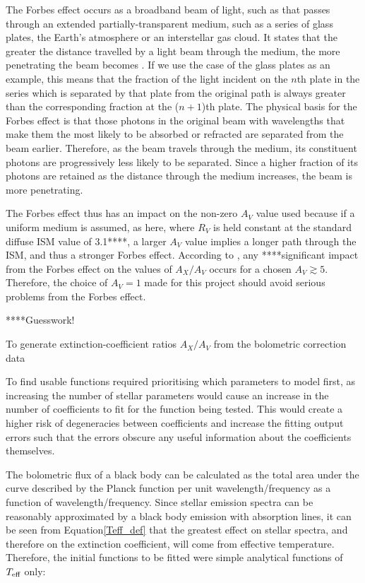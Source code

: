 \documentclass[12pt, a4paper]{report}
\begin{document}
The Forbes effect occurs as a broadband beam of light, such as that passes through an extended partially-transparent medium, such as a series of glass plates, the Earth's atmosphere or an interstellar gas cloud. It states that the greater the distance travelled by a light beam through the medium, the more penetrating the beam becomes \citep{1842RSPT..132..225F}. If we use the case of the glass plates as an example, this means that the fraction of the light incident on the $n$th plate in the series which is separated by that plate from the original path is always greater than the corresponding fraction at the ($n+1$)th plate. The physical basis for the Forbes effect is that those photons in the original beam with wavelengths that make them the most likely to be absorbed or refracted are separated from the beam earlier. Therefore, as the beam travels through the medium, its constituent photons are progressively less likely to be separated. Since a higher fraction of its photons are retained as the distance through the medium increases, the beam is more penetrating.

The Forbes effect thus has an impact on the non-zero $A_{V}$ value used because if a uniform medium is assumed, as here, where $R_{V}$ is held constant at the standard diffuse ISM value of 3.1****, a larger $A_{V}$ value implies a longer path through the ISM, and thus a stronger Forbes effect. According to \cite{2008PASP..120..583G}, any ****significant impact from the Forbes effect on the values of $A_{X}/A_{V}$ occurs for a chosen $A_{V} \gtrsim 5$. Therefore, the choice of $A_{V} = 1$ made for this project should avoid serious problems from the Forbes effect.

****Guesswork!

To generate extinction-coefficient ratios $A_{X}/A_{V}$ from the bolometric correction data

To find usable functions required prioritising which parameters to model first, as increasing the number of stellar parameters would cause an increase in the number of coefficients to fit for the function being tested. This would create a higher risk of degeneracies between coefficients and increase the fitting output errors such that the errors obscure any useful information about the coefficients themselves.

The bolometric flux of a black body can be calculated as the total area under the curve described by the Planck function per unit wavelength/frequency as a function of wavelength/frequency. Since stellar emission spectra can be reasonably approximated by a black body emission with absorption lines, it can be seen from Equation\ref{Teff_def} that the greatest effect on stellar spectra, and therefore on the extinction coefficient, will come from effective temperature. Therefore, the initial functions to be fitted were simple analytical functions of $T_{\textnormal{eff}}$ only:
\end{document}
